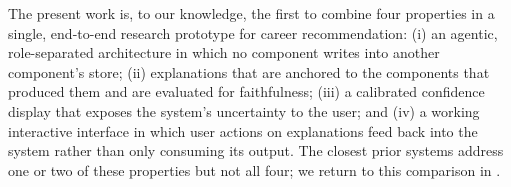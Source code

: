The present work is, to our knowledge, the first to combine four properties in a single, end-to-end research prototype for career recommendation: (i) an agentic, role-separated architecture in which no component writes into another component's store; (ii) explanations that are anchored to the components that produced them and are evaluated for faithfulness; (iii) a calibrated confidence display that exposes the system's uncertainty to the user; and (iv) a working interactive interface in which user actions on explanations feed back into the system rather than only consuming its output.
The closest prior systems address one or two of these properties but not all four; we return to this comparison in .

